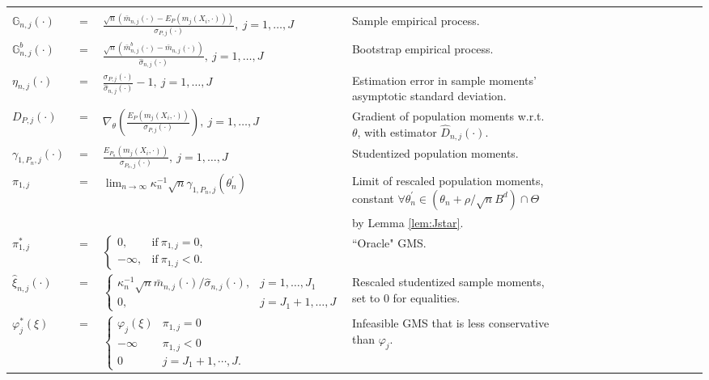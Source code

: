 \documentclass[letterpaper,11pt]{article}
\theoremstyle{myplain}
\theoremstyle{mydefinition}
\theoremstyle{myremark}
\newcommand{\G}{\mathbb{G}}
\newcommand{\thetnprime}{(\theta_n +\rho /\sqrt{n} B^d)\cap \Theta}
\numberwithin{equation}{section}
\numberwithin{figure}{section}
\begin{document}
\begin{appendices}
\begin{table}[htbp]
{\begin{tabular}{lllllllllllllllll}
\hline \hline
\\ 
$\G_{n,j}(\cdot) $ & $=$ & $ \frac{\sqrt n (\bar{m}_{n,j}(\cdot) - E_P(m_j(X_i,\cdot)))}{\sigma_{P,j}(\cdot)},~j=1,\dots,J$ & Sample empirical process.\\ 
[0.2cm]
$\G_{n,j}^b(\cdot) $ & $=$ & $ \frac{\sqrt n (\bar{m}^b_{n,j}(\cdot) - \bar{m}_{n,j}(\cdot))}{\hat{\sigma}_{n,j}(\cdot)},~j=1,\dots,J$ & Bootstrap empirical process. \\ 
[0.2cm]
$\eta_{n,j}(\cdot) $ & $=$ & $ \frac{\sigma_{P,j}(\cdot)}{\hat{\sigma}_{n,j}(\cdot)}-1,~j=1,\dots,J$ & Estimation error in sample moments' asymptotic standard deviation.\\
[0.2cm]
$D_{P,j}(\cdot) $ & $=$ & $ \nabla_\theta \left(\frac{E_P(m_j(X_i,\cdot))}{\sigma_{P,j}(\cdot)} \right),~j=1,\dots,J$ & Gradient of population moments w.r.t. $\theta$, with estimator $\hat{D}_{n,j}(\cdot) $. \\
[0.2cm]
$\gamma_{1,P_n,j}(\cdot) $ & $=$ & $ \frac{E_{P_n}(m_j(X_i,\cdot))}{\sigma_{P_n,j}(\cdot)},~j=1,\dots,J$ & Studentized population moments. \\
[0.4cm]
$\pi_{1,j}$ & $=$ & $\lim_{n \to \infty} \kappa_{n}^{-1} \sqrt {n} \gamma_{1,P_n,j}(\theta_{n}^\prime)$ & Limit of rescaled population moments, constant $\forall \theta_n^\prime \in \thetnprime$\\
 &  &  & by Lemma \ref{lem:Jstar}.\\
$\pi_{1,j}^*$ & $=$ & $\left\{ \begin{matrix}
   0, & \mathrm{if}~\pi_{1,j}=0,\\
   -\infty, & \mathrm{if}~\pi_{1,j}<0.
\end{matrix}\right.$ & ``Oracle" GMS.\\
[0.4cm]
$\hat{\xi}_{n,j}(\cdot)$ & $=$ & $\left\{\begin{array}{ll}
\kappa_n^{-1}\sqrt n\bar m_{n,j}(\cdot)/\hat\sigma_{n,j}(\cdot), & j=1,\dots,J_1 \\ 
0, & j=J_1+1,\dots,J
\end{array}\right.$  & Rescaled studentized sample moments, set to $0$ for equalities. \\
[0.5cm]
$\varphi^*_j(\xi)$& $=$ & $\begin{cases}
	\varphi_j(\xi)&\pi_{1,j}=0\\
	-\infty&\pi_{1,j}<0\\
	0&j=J_1+1,\cdots,J.
\end{cases}$ & Infeasible GMS that is less conservative than $\varphi_j$.  \\

\end{tabular}}
\end{table}
\end{appendices}
\end{document}
